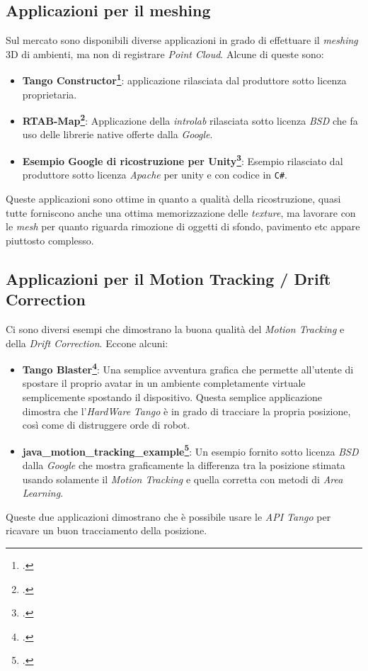 \subsection{Applicazioni per il meshing}
Sul mercato sono disponibili diverse applicazioni in grado di effettuare il \emph{meshing} 3D di ambienti, ma non di registrare \emph{Point Cloud}. Alcune di queste sono:
\begin{itemize}
	\item \textbf{Tango Constructor\footcite{site: https://developers.google.com/tango/tools/constructor}}: applicazione rilasciata dal produttore sotto licenza proprietaria.
	\item \textbf{RTAB-Map\footcite{site: http://introlab.github.io/rtabmap/}}: Applicazione della \emph{introlab} rilasciata sotto licenza \emph{BSD} che fa uso delle librerie native offerte dalla \emph{Google}.
	\item \textbf{Esempio Google di ricostruzione per Unity\footcite{site: https://github.com/googlesamples/tango-examples-unity}}: Esempio rilasciato dal produttore sotto licenza \emph{Apache} per unity e con codice in \texttt{C\#}.
\end{itemize}
Queste applicazioni sono ottime in quanto a qualità della ricostruzione, quasi tutte forniscono anche una ottima memorizzazione delle \emph{texture}, ma lavorare con le \emph{mesh} per quanto riguarda rimozione di oggetti di sfondo, pavimento etc appare piuttosto complesso.

\subsection{Applicazioni per il Motion Tracking / Drift Correction}
Ci sono diversi esempi che dimostrano la buona qualità del \emph{Motion Tracking} e della \emph{Drift Correction}.
Eccone alcuni:
\begin{itemize}
	\item \textbf{Tango Blaster\footcite{site: https://play.google.com/store/apps/details?id=com.projecttango.tangoblaster}}: Una semplice avventura grafica che permette all'utente di spostare il proprio avatar in un ambiente completamente virtuale semplicemente spostando il dispositivo. Questa semplice applicazione dimostra che l'\emph{HardWare} \emph{Tango} è in grado di tracciare la propria posizione, così come di distruggere orde di robot.
	\item \textbf{java\_motion\_tracking\_example\footcite{site: https://github.com/googlesamples/tango-examples-java/tree/master}}: Un esempio fornito sotto licenza \emph{BSD} dalla \emph{Google} che mostra graficamente la differenza tra la posizione stimata usando solamente il \emph{Motion Tracking} e quella corretta con metodi di \emph{Area Learning}.
\end{itemize}
Queste due applicazioni dimostrano che è possibile usare le \emph{API Tango} per ricavare un buon tracciamento della posizione.

